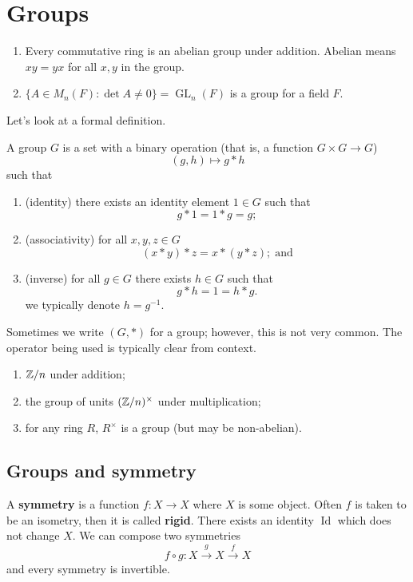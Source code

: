\chapter{Groups}

\begin{example}
    \hfill
    \begin{enumerate}
        \item Every commutative ring is an abelian group under addition.
            Abelian means $xy = yx$ for all $x, y$ in the group.

        \item $\{A \in M_n(F): \det A\neq 0\}=\operatorname{GL}_n(F)$
            is a group for a field $F$.
    \end{enumerate}
\end{example}

Let's look at a formal definition.

\begin{definition}[Group]
    A group $G$ is a set with a binary operation
    (that is, a function $G \times G \to G$)
    \[ (g, h) \mapsto g * h \]
    such that
    \begin{enumerate}
        \item (identity) there exists an identity element $1 \in G$ such that
            \[ g * 1 = 1 * g = g; \]
        \item (associativity) for all $x, y, z \in G$
            \[ (x * y) * z = x * (y * z);\;\text{and} \]
        \item (inverse) for all $g \in G$ there exists $h \in G$ such that
            \[ g * h = 1 = h * g. \]
            we typically denote $h = g^{-1}$.
    \end{enumerate}
\end{definition}

Sometimes we write $(G, *)$ for a group; however, this is not very common.
The operator being used is typically clear from context.

\begin{example}
    \hfill
    \begin{enumerate}
        \item $\mathbb{Z}/n$ under addition;
        \item the group of units $(\mathbb{Z}/n)^\times$ under multiplication;
        \item for any ring $R$, $R^\times$ is a group
            (but may be non-abelian).
    \end{enumerate}
\end{example}

\section{Groups and symmetry}

A \textbf{symmetry} is a function $f: X \to X$ where $X$ is some object.
Often $f$ is taken to be an isometry, then it is called \textbf{rigid}.
There exists an identity $\operatorname{Id}$ which does not change $X$.
We can compose two symmetries
\[ f \circ g: X \xrightarrow{g} X \xrightarrow{f} X \]
and every symmetry is invertible.
